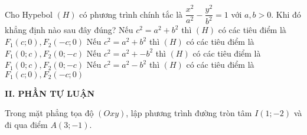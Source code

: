 \begin{ex}%
Cho Hypebol $(H)$ có phương trình chính tắc là $\dfrac{x^{2}}{a^{2}}-\dfrac{y^{2}}{b^{2}}=1$ với $a,b>0$. Khi đó khẳng định nào sau đây đúng?
	\choice
	{\True Nếu $c^{2}=a^{2}+b^{2}$ thì $(H)$ có các tiêu điểm là $F_{1}(c;0), F_{2}(-c;0)$}
	{Nếu $c^{2}=a^{2}+b^{2}$ thì $(H)$ có các tiêu điểm là $F_{1}(0;c), F_{2}(0;-c)$}
	{Nếu $c^{2}=a^{2}+-b^{2}$ thì $(H)$ có các tiêu điểm là $F_{1}(0;c), F_{2}(0;-c)$}
	{Nếu $c^{2}=a^{2}-b^{2}$ thì $(H)$ có các tiêu điểm là $F_{1}(c;0), F_{2}(-c;0)$}
\end{ex}


\noindent\textbf{II. PHẦN TỰ LUẬN}
\begin{bt}%
	Trong mặt phẳng tọa độ $(Oxy)$, lập phương trình đường tròn tâm $I(1;-2)$ và đi qua điểm $A(3;-1)$.
	\loigiai
	{
	}
\end{bt}
